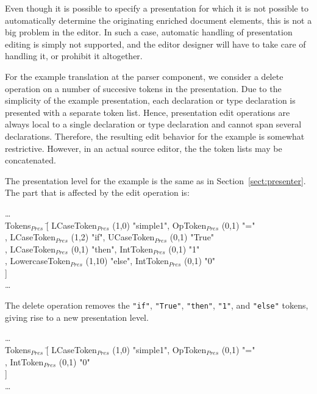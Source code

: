 Even though it is possible to specify a presentation for which it is not possible to automatically determine the originating enriched document elements, this is not a big problem in the editor. In such a case, automatic handling of presentation editing is simply not supported, and the editor designer will have to take care of handling it, or prohibit it altogether. 

For the example translation at the parser component, we consider a delete operation on a number of succesive tokens in the presentation. Due to the simplicity of the example presentation, each declaration or type declaration is presented with a separate token list. Hence, presentation edit operations are always local to a single declaration or type declaration and cannot span several declarations. Therefore, the resulting edit behavior for the example is somewhat restrictive. However, in an actual source editor, the the token lists may be concatenated.

The presentation level for the example is the same as in Section~\ref{sect:presenter}. The part that is affected by the edit operation is: 

\small \ttfamily
\begin{tabbing}
\dots\\
Tokens$_{Pres}$ \= [ LCaseToken$_{Pres}$ (1,0) "simple1", OpToken$_{Pres}$ (0,1) "="\\
                         \> , LCaseToken$_{Pres}$ (1,2) "if", UCaseToken$_{Pres}$ (0,1) "True"\\
                         \> , LCaseToken$_{Pres}$ (0,1) "then", IntToken$_{Pres}$ (0,1) "1"\\
                         \> , LowercaseToken$_{Pres}$ (1,10) "else", IntToken$_{Pres}$ (0,1) "0"\\
                         \> ]\\
\dots                                                  
\end{tabbing}
\rmfamily \normalsize

The delete operation removes the \verb|"if"|,  \verb|"True"|,  \verb|"then"|,  \verb|"1"|, and  \verb|"else"| tokens, giving rise to a new presentation level.

\small \ttfamily
\begin{tabbing}
\dots\\
Tokens$_{Pres}$ \= [ LCaseToken$_{Pres}$ (1,0) "simple1", OpToken$_{Pres}$ (0,1) "="\\
                         \> ,  IntToken$_{Pres}$ (0,1) "0"\\
                         \> ]\\
\dots                                                  
\end{tabbing}
\rmfamily \normalsize

